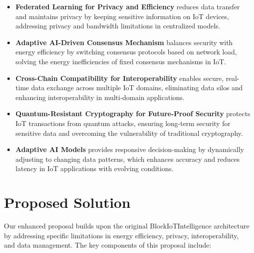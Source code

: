 \documentclass[12pt, oneside]{report}
\begin{document}
\begin{itemize}
    \item \textbf{Federated Learning for Privacy and Efficiency} reduces data transfer and maintains privacy by keeping sensitive information on IoT devices, addressing privacy and bandwidth limitations in centralized models.


    \item \textbf{Adaptive AI-Driven Consensus Mechanism} balances security with energy efficiency by switching consensus protocols based on network load, solving the energy inefficiencies of fixed consensus mechanisms in IoT.
    \item \textbf{Cross-Chain Compatibility for Interoperability} enables secure, real-time data exchange across multiple IoT domains, eliminating data silos and enhancing interoperability in multi-domain applications.
    \item \textbf{Quantum-Resistant Cryptography for Future-Proof Security} protects IoT transactions from quantum attacks, ensuring long-term security for sensitive data and overcoming the vulnerability of traditional cryptography.

    \item \textbf{Adaptive AI Models} provides responsive decision-making by dynamically adjusting to changing data patterns, which enhances accuracy and reduces latency in IoT applications with evolving conditions.
   
\end{itemize}
\section{Proposed Solution}
Our enhanced proposal builds upon the original BlockIoTIntelligence architecture by addressing specific limitations in energy efficiency, privacy, interoperability, and data management. The key components of this proposal include:
\end{document}
